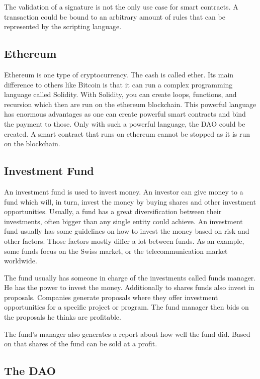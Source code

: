 \documentclass[a4paper, 11pt]{scrartcl}
\begin{document}
The validation of a signature is not the only use case for smart contracts.
A transaction could be bound to an arbitrary amount of rules that can be represented by the scripting language. \cite{blockchainKai}

\subsection{Ethereum}

Ethereum is one type of cryptocurrency.
The cash is called ether.
Its main difference to others like Bitcoin is that it can run a complex programming language called Solidity.
With Solidity, you can create loops, functions, and recursion which then are run on the ethereum blockchain. 
This powerful language has enormous advantages as one can create powerful smart contracts and bind the payment to those.
Only with such a powerful language, the DAO could be created. 
A smart contract that runs on ethereum cannot be stopped as it is run on the blockchain. \cite{eth}

\subsection{Investment Fund}

An investment fund is used to invest money. An investor can give money to a fund which will, in turn, invest the money by buying shares and other investment opportunities. Usually, a fund has a great diversification between their investments, often bigger than any single entity could achieve. An investment fund usually has some guidelines on how to invest the money based on risk and other factors. Those factors mostly differ a lot between funds. As an example, some funds focus on the Swiss market, or the telecommunication market worldwide. \cite{fund}

The fund usually has someone in charge of the investments called funds manager. He has the power to invest the money. Additionally to shares funds also invest in proposals. Companies generate proposals where they offer investment opportunities for a specific project or program. The fund manager then bids on the proposals he thinks are profitable. \cite{proposal}

The fund's manager also generates a report about how well the fund did. Based on that shares of the fund can be sold at a profit. 

\subsection{The DAO}
\end{document}
